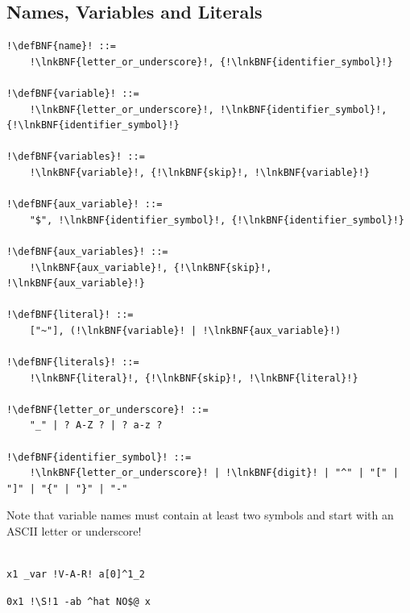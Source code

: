 \documentclass[a4paper]{article}
\newcommand{\defBNF}[1]{\hypertarget{def:#1}{<\detokenize{#1}>}}
\newcommand{\lnkBNF}[1]{\hyperlink{def:#1}{<\detokenize{#1}>}}
\begin{document}
\subsection{Names, Variables and Literals}\label{sec:variables-literals}
\begin{lstlisting}
!\defBNF{name}! ::=
	!\lnkBNF{letter_or_underscore}!, {!\lnkBNF{identifier_symbol}!}

!\defBNF{variable}! ::=
	!\lnkBNF{letter_or_underscore}!, !\lnkBNF{identifier_symbol}!, {!\lnkBNF{identifier_symbol}!}

!\defBNF{variables}! ::=
	!\lnkBNF{variable}!, {!\lnkBNF{skip}!, !\lnkBNF{variable}!}

!\defBNF{aux_variable}! ::=
	"$", !\lnkBNF{identifier_symbol}!, {!\lnkBNF{identifier_symbol}!}

!\defBNF{aux_variables}! ::=
	!\lnkBNF{aux_variable}!, {!\lnkBNF{skip}!, !\lnkBNF{aux_variable}!}

!\defBNF{literal}! ::=
	["~"], (!\lnkBNF{variable}! | !\lnkBNF{aux_variable}!)

!\defBNF{literals}! ::=
	!\lnkBNF{literal}!, {!\lnkBNF{skip}!, !\lnkBNF{literal}!}

!\defBNF{letter_or_underscore}! ::=
	"_" | ? A-Z ? | ? a-z ?

!\defBNF{identifier_symbol}! ::=
	!\lnkBNF{letter_or_underscore}! | !\lnkBNF{digit}! | "^" | "[" | "]" | "{" | "}" | "-"
\end{lstlisting}
Note that variable names must contain at least two symbols and start with an ASCII letter or underscore!
\\~\\
\begin{minipage}{.49\linewidth}
	\begin{lstlisting}[language=veripb, gobble=4, rulecolor=\color{veripb-valid-text}, caption={Syntactically correct variable names.}]
	x1 _var !V-A-R! a[0]^1_2
	\end{lstlisting}
\end{minipage}\hfill%
\begin{minipage}{.49\linewidth}
	\begin{lstlisting}[language=veripb, gobble=4, rulecolor=\color{veripb-invalid-text}, caption={Syntactically incorrect variable names.}]
	0x1 !\S!1 -ab ^hat NO$@ x
	\end{lstlisting}
\end{minipage}
\end{document}
